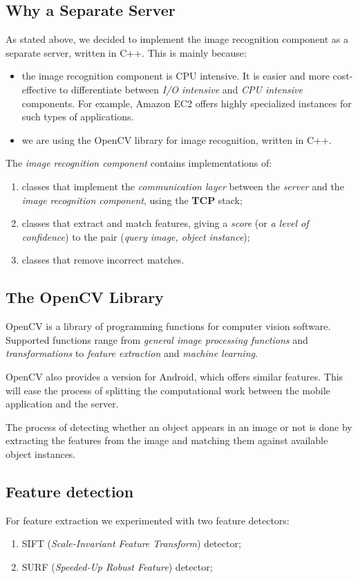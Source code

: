 \documentclass[a4paper,onecolumn,oneside,titlepage,11pt]{report}
\begin{document}
\subsection{Why a Separate Server}
As stated above, we decided to implement the image recognition component as a separate server, written in C++. This is mainly because:
\begin{itemize}
	\item the image recognition component is CPU intensive. It is easier and more cost-effective to differentiate between \emph{I/O intensive} and \emph{CPU intensive} components. For example, Amazon EC2 offers highly specialized instances for such types of applications.
	\item we are using the OpenCV library for image recognition, written in C++.
\end{itemize}
The \emph{image recognition component} contains implementations of:
\begin{enumerate}
	\item classes that implement the \emph{communication layer} between the \emph{server} and the \emph{image recognition component}, using the \textbf{TCP} stack;
	\item classes that extract and match features, giving a \emph{score} (or \emph{a level of confidence}) to the pair (\emph{query image, object instance});
	\item classes that remove incorrect matches.
\end{enumerate}
\subsection{The OpenCV Library}
OpenCV\cite{opencv} is a library of programming functions for computer vision software. Supported functions range from \emph{general image processing functions} and \emph{transformations} to \emph{feature extraction} and \emph{machine learning}.

OpenCV also provides a version for Android, which offers similar features. This will ease the process of splitting the computational work between the mobile application and the server.

The process of detecting whether an object appears in an image or not is done by extracting the features from the image and matching them against available object instances.

\subsection{Feature detection}
For feature extraction we experimented with two feature detectors:
\begin{enumerate}
	\item SIFT (\emph{Scale-Invariant Feature Transform}) detector;
	\item SURF (\emph{Speeded-Up Robust Feature}) detector;
\end{enumerate}
\end{document}
